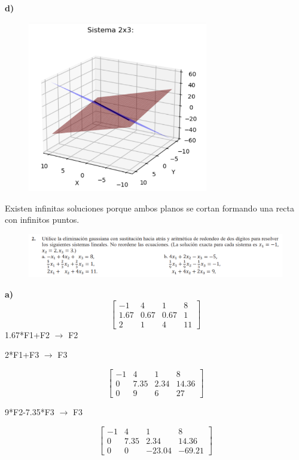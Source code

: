 \documentclass[12pt]{article}
\begin{document}
\textbf{d)}
\begin{figure}[H]
\centering
\includegraphics[width=0.7\textwidth]{./inFiles/Figures/Ej1d.png}
\end{figure}

Existen infinitas soluciones porque ambos planos se cortan formando una recta con infinitos puntos.


\begin{figure}[H]
\includegraphics[width=1\textwidth]{./inFiles/Figures/Ej2.png}
\end{figure}

\textbf{a)}
\[
\begin{bmatrix}
-1 & 4 & 1 & 8 \\
1.67 & 0.67 & 0.67 & 1 \\
2 & 1 & 4 & 11
\end{bmatrix}
\]
1.67*F1+F2 $\longrightarrow $ F2

2*F1+F3 $\longrightarrow $ F3

\[
\begin{bmatrix}
-1 & 4 & 1 & 8 \\
0 & 7.35 & 2.34& 14.36 \\
0 & 9 & 6 & 27
\end{bmatrix}
\]

9*F2-7.35*F3 $\longrightarrow $ F3

\[
\begin{bmatrix}
-1 & 4 & 1 & 8 \\
0 & 7.35 & 2.34& 14.36 \\
0 & 0 & -23.04 & -69.21
\end{bmatrix}
\]
\end{document}
